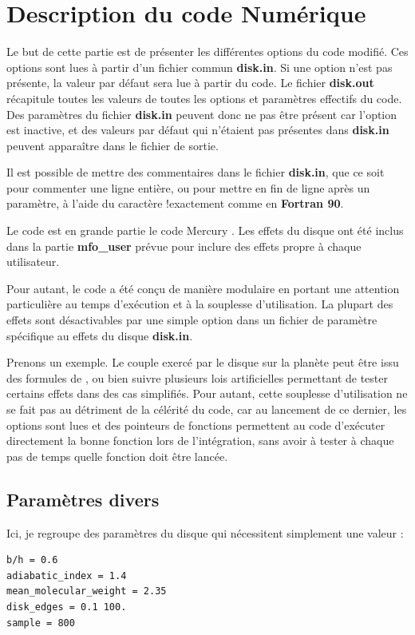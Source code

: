 \chapter{Description du code Numérique}\label{sec:nbody-readme}
Le but de cette partie est de présenter les différentes options du code modifié. Ces options sont lues à partir d'un fichier commun \textbf{disk.in}. Si une option n'est pas présente, la valeur par défaut sera lue à partir du code. Le fichier \textbf{disk.out} récapitule toutes les valeurs de toutes les options et paramètres effectifs du code. Des paramètres du fichier \textbf{disk.in} peuvent donc ne pas être présent car l'option est inactive, et des valeurs par défaut qui n'étaient pas présentes dans \textbf{disk.in} peuvent apparaître dans le fichier de sortie.

Il est possible de mettre des commentaires dans le fichier \textbf{disk.in}, que ce soit pour commenter une ligne entière, ou pour mettre en fin de ligne après un paramètre, à l'aide du caractère \og !\fg exactement comme en \textbf{Fortran 90}.

Le code est en grande partie le code Mercury \cite{chambers1999hybrid}. Les effets du disque ont été inclus dans la partie \textbf{mfo\_user} prévue pour inclure des effets propre à chaque utilisateur. 

Pour autant, le code a été conçu de manière modulaire en portant une attention particulière au temps d'exécution et à la souplesse d'utilisation. La plupart des effets sont désactivables par une simple option dans un fichier de paramètre spécifique au effets du disque \textbf{disk.in}. 

Prenons un exemple. Le couple exercé par le disque sur la planète peut être issu des formules de \cite{paardekooper2011torque}, ou bien suivre plusieurs lois artificielles permettant de tester certains effets dans des cas simplifiés. Pour autant, cette souplesse d'utilisation ne se fait pas au détriment de la célérité du code, car au lancement de ce dernier, les options sont lues et des pointeurs de fonctions permettent au code d'exécuter directement la bonne fonction lors de l'intégration, sans avoir à tester à chaque pas de temps quelle fonction doit être lancée. 

\section{Paramètres divers}
Ici, je regroupe des paramètres du disque qui nécessitent simplement une valeur : 
\begin{verbatim}
b/h = 0.6
adiabatic_index = 1.4
mean_molecular_weight = 2.35
disk_edges = 0.1 100.
sample = 800
\end{verbatim}

